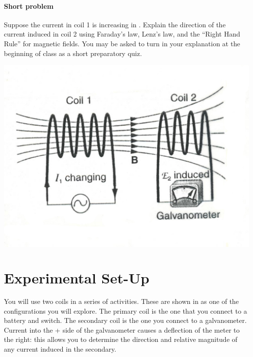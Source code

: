 \begin{multicols}{2}
\paragraph{Short problem}
Suppose the current in coil 1 is increasing in .  Explain the direction of the current induced in coil 2 using Faraday's law, Lenz's law, and the ``Right Hand Rule'' for magnetic fields.  You may be asked to turn in your explanation at the beginning of class as a short preparatory quiz.


\begin{center}
	\includegraphics[scale=1]{5bgraf/fig_12}
	\label{f:fig_12}
\end{center}

\section{Experimental Set-Up}
You will use two coils in a series of activities.  These are shown in  as one of the configurations you will explore.  The primary coil is the one that you connect to a battery and switch.  The secondary coil is the one you connect to a galvanometer.  Current into the + side of the galvanometer causes a deflection of the meter to the right: this allows you to determine the direction and relative magnitude of any current induced in the secondary.



\end{multicols}
